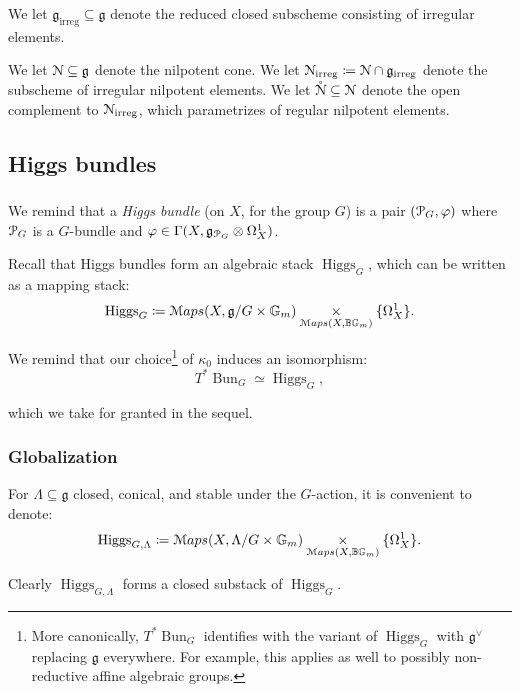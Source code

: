 \documentclass[reqno,11pt]{amsart}
\numberwithin{equation}{subsection}
\theoremstyle{remark}
\newcommand{\bB}{{\mathbb B}}
\newcommand{\bG}{{\mathbb G}}
\newcommand{\sM}{{\EuScript M}}
\newcommand{\sN}{{\EuScript N}}
\newcommand{\sP}{{\EuScript P}}
\newcommand{\fg}{{\mathfrak g}}
\newcommand{\on}{\operatorname}
\newcommand{\vph}{\varphi}
\newcommand{\Bun}{\on{Bun}}
\newcommand{\Maps}{\sM aps}
\renewcommand{\o}[1]{\mathring{#1}}
\renewcommand{\subset}{\subseteq}
\newcommand{\Higgs}{\on{Higgs}}
\newcommand{\irreg}{\on{irreg}}
\begin{document}
\subsubsection{} We let $\fg_{\irreg} \subset \fg$ denote the reduced closed 
subscheme consisting of irregular elements. 

We let $\sN \subset \fg$ denote the nilpotent cone. 
We let $\sN_{\irreg} \coloneqq \sN \cap \fg_{\irreg}$ denote the subscheme
of irregular nilpotent elements. We let $\o{\sN} \subset \sN$
denote the open complement to $\sN_{\irreg}$, which parametrizes of
regular nilpotent elements.

\subsection{Higgs bundles}

\subsubsection{}

We remind that a \emph{Higgs bundle} (on $X$, for the group $G$) is a pair
$(\sP_G,\vph)$ where $\sP_G$ is a $G$-bundle and 
$\vph \in \Gamma(X,\fg_{\sP_G} \otimes \Omega_X^1)$.

Recall that Higgs bundles form an algebraic stack $\Higgs_G$, which 
can be written as a mapping stack:
%
\[
\Higgs_G \coloneqq
\Maps(X,\fg/{G \times \bG_m}) \underset{\Maps(X,\bB \bG_m)}{\times}
\{\Omega_X^1\}.
\]

We remind that our choice\footnote{More canonically, 
$T^*\Bun_G$ identifies with the variant of $\Higgs_G$ with 
$\fg^{\vee}$ replacing $\fg$ everywhere. For example, this applies
as well to possibly non-reductive affine algebraic groups.} 
of $\kappa_0$ induces an isomorphism:
%
\[
T^*\Bun_G \simeq \Higgs_G,
\]

\noindent which we take for granted in the sequel.

\subsubsection{Globalization}\label{sss:globalization}

For $\Lambda \subset \fg$ closed, conical, and stable under the $G$-action, 
it is convenient to denote:
%
\[
\Higgs_{G,\Lambda} \coloneqq 
\Maps(X,\Lambda/{G \times \bG_m}) \underset{\Maps(X,\bB \bG_m)}{\times}
\{\Omega_X^1\}.
\]

\noindent Clearly $\Higgs_{G,\Lambda}$ forms a closed substack of
$\Higgs_G$.
\end{document}

